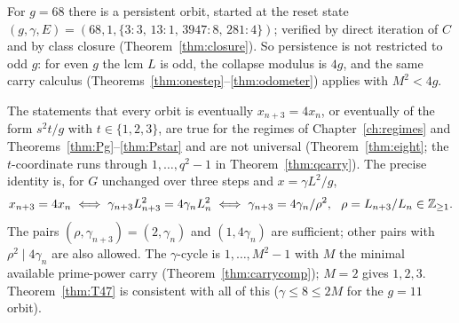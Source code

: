 \begin{example}\label{ex:68}
For \(g=68\) there is a persistent orbit, started at the reset state \((g,\gamma,E)=(68,1,\{3:3,\,13:1,\,3947:8,\,281:4\})\); verified by direct iteration of \(C\) and by class closure (Theorem~\ref{thm:closure}). So persistence is not restricted to odd \(g\): for even \(g\) the lcm \(L\) is odd, the collapse modulus is \(4g\), and the same carry calculus (Theorems~\ref{thm:onestep}--\ref{thm:odometer}) applies with \(M^2<4g\).
\end{example}

\begin{remark}\label{rem:T58}
The statements that every orbit is eventually \(x_{n+3}=4x_n\), or eventually of the form \(s^2t/g\) with \(t\in\{1,2,3\}\), are true for the regimes of Chapter~\ref{ch:regimes} and Theorems~\ref{thm:Pg}--\ref{thm:Pstar} and are not universal (Theorem~\ref{thm:eight}; the \(t\)-coordinate runs through \(1,\dots,q^2-1\) in Theorem~\ref{thm:qcarry}). The precise identity is, for \(G\) unchanged over three steps and \(x=\gamma L^2/g\),
\[
x_{n+3}=4x_n\iff\gamma_{n+3}L_{n+3}^2=4\gamma_nL_n^2\iff\gamma_{n+3}=4\gamma_n/\rho^2,\ \ \rho=L_{n+3}/L_n\in\Z_{\ge1}.
\]
The pairs \((\rho,\gamma_{n+3})=(2,\gamma_n)\) and \((1,4\gamma_n)\) are sufficient; other pairs with \(\rho^2\mid4\gamma_n\) are also allowed. The \(\gamma\)-cycle is \(1,\dots,M^2-1\) with \(M\) the minimal available prime-power carry (Theorem~\ref{thm:carrycomp}); \(M=2\) gives \(1,2,3\). Theorem~\ref{thm:T47} is consistent with all of this (\(\gamma\le8\le2M\) for the \(g=11\) orbit).
\end{remark}
